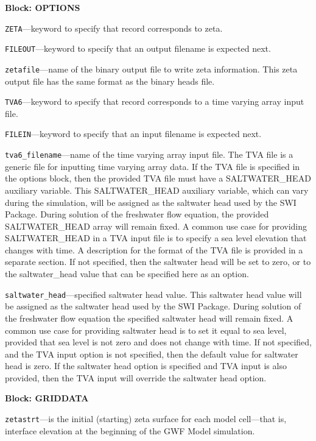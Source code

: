 
\item \textbf{Block: OPTIONS}

\begin{description}
\item \texttt{ZETA}---keyword to specify that record corresponds to zeta.

\item \texttt{FILEOUT}---keyword to specify that an output filename is expected next.

\item \texttt{zetafile}---name of the binary output file to write zeta information.  This zeta output file has the same format as the binary heads file.

\item \texttt{TVA6}---keyword to specify that record corresponds to a time varying array input file.

\item \texttt{FILEIN}---keyword to specify that an input filename is expected next.

\item \texttt{tva6\_filename}---name of the time varying array input file.  The TVA file is a generic file for inputting time varying array data.  If the TVA file is specified in the options block, then the provided TVA file must have a SALTWATER\_HEAD auxiliary variable.  This SALTWATER\_HEAD auxiliary variable, which can vary during the simulation, will be assigned as the saltwater head used by the SWI Package. During solution of the freshwater flow equation, the provided SALTWATER\_HEAD array will remain fixed.  A common use case for providing SALTWATER\_HEAD in a TVA input file is to specify a sea level elevation that changes with time.  A description for the format of the TVA file is provided in a separate section.  If not specified, then the saltwater head will be set to zero, or to the saltwater\_head value that can be specified here as an option.

\item \texttt{saltwater\_head}---specified saltwater head value.  This saltwater head value will be assigned as the saltwater head used by the SWI Package. During solution of the freshwater flow equation the specified saltwater head will remain fixed.  A common use case for providing saltwater head is to set it equal to sea level, provided that sea level is not zero and does not change with time.  If not specified, and the TVA input option is not specified, then the default value for saltwater head is zero.  If the saltwater head option is specified and TVA input is also provided, then the TVA input will override the saltwater head option.

\end{description}
\item \textbf{Block: GRIDDATA}

\begin{description}
\item \texttt{zetastrt}---is the initial (starting) zeta surface for each model cell---that is, interface elevation at the beginning of the GWF Model simulation.

\end{description}

